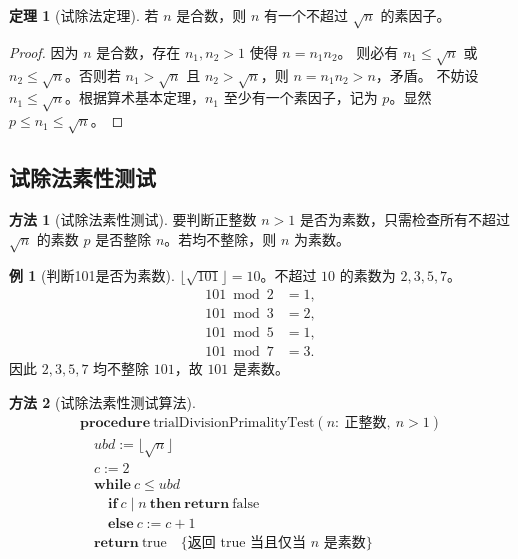 \documentclass[UTF8,11pt,a4paper]{ctexbook}   %
\theoremstyle{definition}
\newtheorem{theorem}{定理}[section]
\newtheorem{example}{例}[section]
\newtheorem{method}{方法}[section]
\begin{document}
\begin{theorem}[试除法定理]
若 $n$ 是合数，则 $n$ 有一个不超过 $\sqrt{n}$ 的素因子。
\end{theorem}

\begin{proof}
因为 $n$ 是合数，存在 $n_1,n_2>1$ 使得 $n=n_1n_2$。
则必有 $n_1\le\sqrt{n}$ 或 $n_2\le\sqrt{n}$。否则若 $n_1>\sqrt{n}$ 且 $n_2>\sqrt{n}$，则 $n=n_1n_2>n$，矛盾。
不妨设 $n_1\le\sqrt{n}$。根据算术基本定理，$n_1$ 至少有一个素因子，记为 $p$。显然 $p\le n_1\le\sqrt{n}$。
\end{proof}

\subsection{试除法素性测试}

\begin{method}[试除法素性测试]
要判断正整数 $n>1$ 是否为素数，只需检查所有不超过 $\sqrt{n}$ 的素数 $p$ 是否整除 $n$。若均不整除，则 $n$ 为素数。
\end{method}

\begin{example}[判断101是否为素数]
$\lfloor\sqrt{101}\rfloor=10$。不超过 $10$ 的素数为 $2,3,5,7$。
\begin{align*}
101 \bmod 2 &= 1,\\
101 \bmod 3 &= 2,\\
101 \bmod 5 &= 1,\\
101 \bmod 7 &= 3.
\end{align*}
因此 $2,3,5,7$ 均不整除 $101$，故 $101$ 是素数。
\end{example}

\begin{method}[试除法素性测试算法]
\[
\begin{array}{l}
\textbf{procedure}\ \text{trialDivisionPrimalityTest}(n:\ \text{正整数},\ n>1)\\
\quad ubd := \lfloor\sqrt{n}\rfloor\\
\quad c := 2\\
\quad \textbf{while}\ c \le ubd\\
\quad \quad \textbf{if}\ c \mid n\ \textbf{then}\ \textbf{return}\ \text{false}\\
\quad \quad \textbf{else}\ c := c+1\\
\quad \textbf{return}\ \text{true}\quad\{\text{返回 true 当且仅当 }n\text{ 是素数}\}
\end{array}
\]
\end{method}
\end{document}
